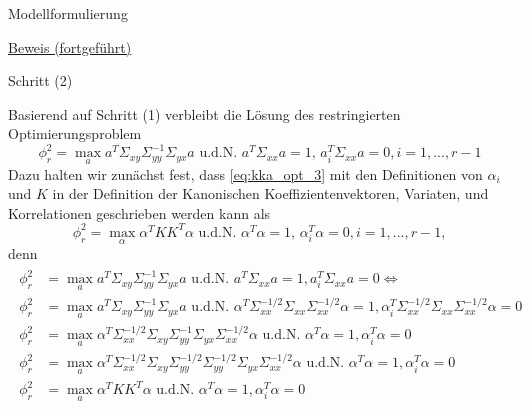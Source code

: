 \documentclass[
  8pt,
  ignorenonframetext,
]{beamer}
\begin{document}
\begin{frame}{Modellformulierung}
\protect\hypertarget{modellformulierung-7}{}
\footnotesize

\underline{Beweis (fortgeführt)}

Schritt (2)

Basierend auf Schritt (1) verbleibt die Lösung des restringierten
Optimierungsproblem \begin{equation}\label{eq:kka_opt_3}
\phi_r^2 = \max_{a} a^T\Sigma_{xy}\Sigma_{yy}^{-1}\Sigma_{yx}a
\mbox{ u.d.N. }
a^T\Sigma_{xx}a   = 1,\,
a_i^T\Sigma_{xx}a = 0,  i = 1,...,r-1
\end{equation} Dazu halten wir zunächst fest, dass \eqref{eq:kka_opt_3}
mit den Definitionen von \(\alpha_i\) und \(K\) in der Definition der
Kanonischen Koeffizientenvektoren, Variaten, und Korrelationen
geschrieben werden kann als \begin{equation}\label{eq:kka_opt_4}
\phi_r^2 = \max_{\alpha} \alpha^T KK^T \alpha
\mbox{ u.d.N. }
\alpha^T \alpha   = 1,\,
\alpha_i^T\alpha  = 0,  i = 1,...,r-1,
\end{equation} denn \tiny \begin{align}
\begin{split}
\phi_r^2 & = \max_{a} a^T\Sigma_{xy}\Sigma_{yy}^{-1}\Sigma_{yx}a
\mbox{ u.d.N. }
a^T\Sigma_{xx}a   = 1,
a_i^T\Sigma_{xx}a = 0 \Leftrightarrow
\\
\phi_r^2 & = \max_{a} a^T\Sigma_{xy}\Sigma_{yy}^{-1}\Sigma_{yx}a
\mbox{ u.d.N. }
\alpha^T\Sigma_{xx}^{-1/2}\Sigma_{xx}\Sigma_{xx}^{-1/2}\alpha = 1,
\alpha^T_i\Sigma_{xx}^{-1/2}\Sigma_{xx}\Sigma_{xx}^{-1/2}\alpha = 0
\\
\phi_r^2 & = \max_{a} \alpha^T\Sigma_{xx}^{-1/2}\Sigma_{xy}\Sigma_{yy}^{-1}\Sigma_{yx}\Sigma_{xx}^{-1/2}\alpha
\mbox{ u.d.N. }
\alpha^T\alpha = 1,
\alpha^T_i\alpha = 0
\\
\phi_r^2 & = \max_{a} \alpha^T\Sigma_{xx}^{-1/2}\Sigma_{xy}\Sigma_{yy}^{-1/2}\Sigma_{yy}^{-1/2}\Sigma_{yx}\Sigma_{xx}^{-1/2}\alpha
\mbox{ u.d.N. }
\alpha^T\alpha = 1,
\alpha^T_i\alpha = 0
\\
\phi_r^2 & = \max_{a} \alpha^TKK^T\alpha
\mbox{ u.d.N. }
\alpha^T\alpha = 1,
\alpha^T_i\alpha = 0
\end{split}
\end{align}
\end{frame}
\end{document}

